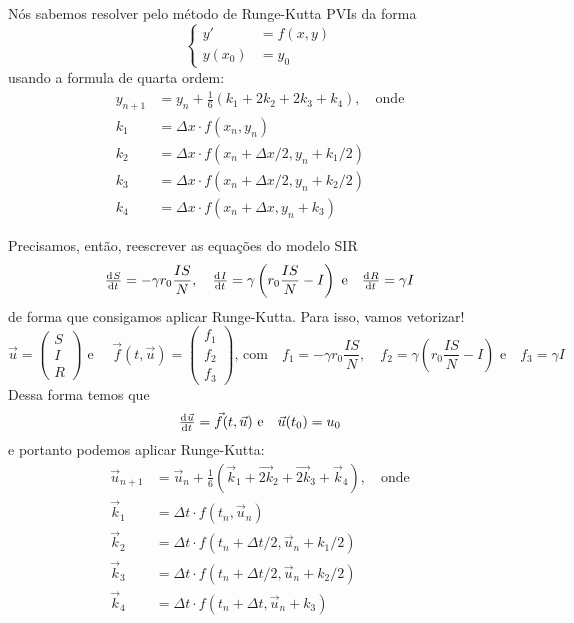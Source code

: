 \documentclass[12pt, a4paper]{minimal}
\begin{document}
Nós sabemos resolver pelo método de Runge-Kutta PVIs da forma
\[
	\left\{ \begin{array}{ll}
	y' &= f(x,y) \\
	y(x_{0}) &= y_{0}
	\end{array} \right.
\]
usando a formula de quarta ordem:
\[
	\begin{split}
	y_{n+1} &= y_n + \frac{1}{6} \left( k_1 + 2 k_2 + 2 k_3 + k_4 \right)
	, \quad \text{onde} \\
	k_1 &= \Delta x \cdot f(x_n, y_n) \\
	k_2 &= \Delta x \cdot f(x_n + \Delta x / 2, y_n + k_1 / 2) \\
	k_3 &= \Delta x \cdot f(x_n + \Delta x / 2, y_n + k_2 / 2) \\
	k_4 &= \Delta x \cdot f(x_n + \Delta x , y_n + k_3 )
	\end{split}
\]

Precisamos, então, reescrever as equações do modelo SIR
\[
	\od{S}{t} = - \gamma r_0 \frac{IS}{N} , \quad
	\od{I}{t} = \gamma \left( r_0 \frac{IS}{N} - I \right) \text{ e} \quad
	\od{R}{t} = \gamma I
\]
de forma que consigamos aplicar Runge-Kutta. Para isso, vamos vetorizar!
\[
	\vec{u} = \left( \begin{array}{rr}
	S \\
	I \\
	R
	\end{array} \right) \text{ e } \quad
	\vec{f}(t,\vec{u}) = \left( \begin{array}{rr}
	f_1 \\
	f_2 \\
	f_3
	\end{array} \right) \text{, com} \quad
	f_1 = - \gamma r_0 \frac{IS}{N} , \quad
	f_2 = \gamma \left( r_0 \frac{IS}{N} - I \right) \text{ e} \quad
	f_3 = \gamma I
\]
Dessa forma temos que
\[
	\od{\vec{u}}{t} = \vec{f}(t, \vec{u}) \text{ e} \quad
	\vec{u}(t_0) = u_0
\]
e portanto podemos aplicar Runge-Kutta:
\[
	\begin{split}
	\vec{u}_{n+1} &= \vec{u}_n + \frac{1}{6} \left( \vec{k}_1 + \vec{2 k}_2 + \vec{2 k}_3 + \vec{k}_4 \right)
	, \quad \text{onde} \\
	\vec{k}_1 &= \Delta t \cdot f(t_n, \vec{u}_n) \\
	\vec{k}_2 &= \Delta t \cdot f(t_n + \Delta t / 2, \vec{u}_n + k_1 / 2) \\
	\vec{k}_3 &= \Delta t \cdot f(t_n + \Delta t / 2, \vec{u}_n + k_2 / 2) \\
	\vec{k}_4 &= \Delta t \cdot f(t_n + \Delta t , \vec{u}_n + k_3 )
	\end{split}
\]
\end{document}
